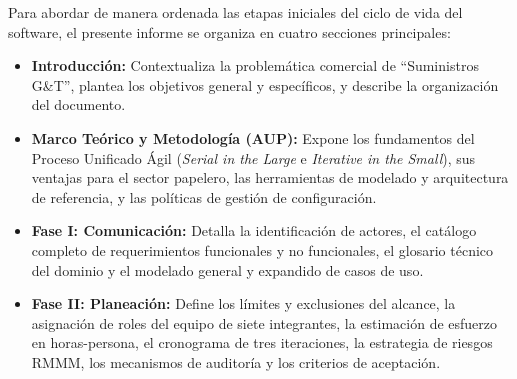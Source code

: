 Para abordar de manera ordenada las etapas iniciales del ciclo de vida del software, el presente informe se organiza en cuatro secciones principales:
\begin{itemize}
    \item \textbf{Introducción:} Contextualiza la problemática comercial de ``Suministros G\&T'', plantea los objetivos general y específicos, y describe la organización del documento.
    \item \textbf{Marco Teórico y Metodología (AUP):} Expone los fundamentos del Proceso Unificado Ágil (\textit{Serial in the Large} e \textit{Iterative in the Small}), sus ventajas para el sector papelero, las herramientas de modelado y arquitectura de referencia, y las políticas de gestión de configuración.
    \item \textbf{Fase I: Comunicación:} Detalla la identificación de actores, el catálogo completo de requerimientos funcionales y no funcionales, el glosario técnico del dominio y el modelado general y expandido de casos de uso.
    \item \textbf{Fase II: Planeación:} Define los límites y exclusiones del alcance, la asignación de roles del equipo de siete integrantes, la estimación de esfuerzo en horas-persona, el cronograma de tres iteraciones, la estrategia de riesgos RMMM, los mecanismos de auditoría y los criterios de aceptación.
\end{itemize}